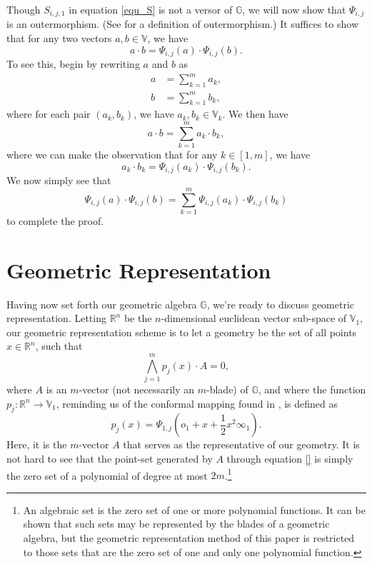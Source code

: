 \documentclass{ecgd-l}
\theoremstyle{definition}
\theoremstyle{remark}
\numberwithin{equation}{section}
\newcommand{\G}{\mathbb{G}}
\newcommand{\V}{\mathbb{V}}
\newcommand{\R}{\mathbb{R}}
\newcommand{\nvai}{\infty}
\newcommand{\nvao}{o}
\begin{document}
Though $S_{i,j,1}$ in equation \eqref{equ_S} is not a versor of $\G$, we will now show that $\Psi_{i,j}$ is an outermorphism.
(See \cite{Hestenes91} for a definition of outermorphism.)  It suffices to show that
for any two vectors $a,b\in\V$, we have
\begin{equation*}
a\cdot b = \Psi_{i,j}(a)\cdot \Psi_{i,j}(b).
\end{equation*}
To see this, begin by rewriting $a$ and $b$ as
\begin{align*}
a &= \sum_{k=1}^m a_k, \\
b &= \sum_{k=1}^m b_k,
\end{align*}
where for each pair $(a_k,b_k)$, we have $a_k,b_k\in\V_k$.  We then have
\begin{equation*}
a\cdot b=\sum_{k=1}^m a_k\cdot b_k,
\end{equation*}
where we can make the observation that for any $k\in[1,m]$, we have
\begin{equation*}
a_k\cdot b_k = \Psi_{i,j}(a_k)\cdot\Psi_{i,j}(b_k).
\end{equation*}
We now simply see that
\begin{equation*}
\Psi_{i,j}(a)\cdot\Psi_{i,j}(b)=\sum_{k=1}^m\Psi_{i,j}(a_k)\cdot\Psi_{i,j}(b_k)
\end{equation*}
to complete the proof.

\section{Geometric Representation}

Having now set forth our geometric algebra $\G$, we're ready to discuss
geometric representation.
Letting $\R^n$ be the $n$-dimensional euclidean vector sub-space
of $\V_1$, our geometric representation scheme is to let a geometry be the
set of all points $x\in\R^n$, such that
\begin{equation*}
\bigwedge_{j=1}^m p_j(x)\cdot A=0,
\end{equation*}
where $A$ is an $m$-vector (not necessarily an $m$-blade) of $\G$, and
where the function $p_j:\R^n\to\V_1$, reminding us of the conformal mapping found in \cite{Hestenes01}, is defined as
\begin{equation*}
p_j(x)=\Psi_{1,j}\left(\nvao_1+x+\frac{1}{2}x^2\nvai_1\right).
\end{equation*}
Here, it is the $m$-vector $A$ that serves as the representative of our geometry.
It is not hard to see that the point-set generated by $A$ through equation \eqref{}
is simply the zero set of a polynomial of degree at most $2m$.\footnote{An algebraic
set is the zero set of one or more polynomial functions.  It can be shown that such sets may be represented by
the blades of a geometric algebra, but the geometric representation method of this paper is restricted to those sets
that are the zero set of one and only one polynomial function.}
\end{document}
